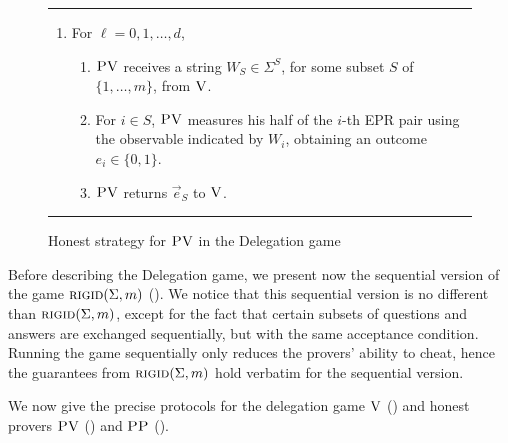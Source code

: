 \documentclass{toc}
\newcommand{\rigid}{\textsc{rigid}}
\newcommand{\ver}{\textsc{V}}
\newcommand{\pv}{\textsc{PV}}
\newcommand{\pp}{\textsc{PP}}
\begin{document}
  \begin{figure}[htbp]
\rule{\textwidth}{0.5pt}
\vspace{-1.8em}
\begin{enumerate}
\item For $\ell=0,1,\ldots,d$,
\begin{enumerate}
\item $\pv$ receives a string $W_{S} \in\Sigma^{S}$, for some subset $S$ of $\{1,\ldots,m\}$, from $\ver$. 
\item For $i\in S$, $\pv$ measures his half of the $i$-th EPR pair using the observable indicated by $W_i$, obtaining an outcome $e_i\in\{0,1\}$. 
\item $\pv$ returns $\vec{e}_S$ to $\ver$. 
\end{enumerate}
\end{enumerate}
\rule[2ex]{\textwidth}{0.5pt}\vspace{-.5cm}
\caption{Honest strategy for $\pv$ in the Delegation game}\label{fig:leash-protocol-PV}
  \end{figure}
  
	
\noindent  Before describing the Delegation game, we present now the sequential version of the game $\rigid(\Sigma,m)$ (). We notice that this sequential version is no different than $\rigid(\Sigma,m)$, except for the fact that certain subsets of questions and answers are exchanged sequentially, but with the same acceptance condition. Running the game sequentially only reduces the provers' ability to cheat, hence the guarantees from $\rigid(\Sigma,m)$ 
hold verbatim for the sequential version. 


We now give the precise protocols for the delegation game $\ver$ ()
and honest provers $\pv$ () and $\pp$
(). 
\end{document}

